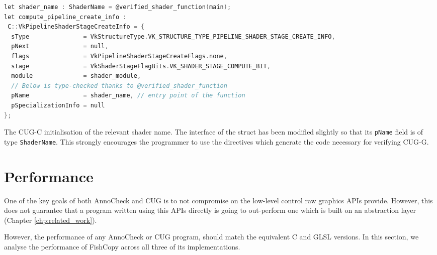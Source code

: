 \documentclass[a4paper,12pt,twoside,openright]{report}
\begin{document}
\begin{lstfloat}
\begin{lstlisting}[language=C]
let shader_name : ShaderName = @verified_shader_function(main);
let compute_pipeline_create_info :
 C::VkPipelineShaderStageCreateInfo = {
  sType               = VkStructureType.VK_STRUCTURE_TYPE_PIPELINE_SHADER_STAGE_CREATE_INFO,
  pNext               = null,
  flags               = VkPipelineShaderStageCreateFlags.none,
  stage               = VkShaderStageFlagBits.VK_SHADER_STAGE_COMPUTE_BIT,
  module              = shader_module,
  // Below is type-checked thanks to @verified_shader_function
  pName               = shader_name, // entry point of the function
  pSpecializationInfo = null
};
\end{lstlisting}
\caption{The CUG-C initialisation of the relevant shader name. The interface of
the struct has been modified slightly so that its \texttt{pName} field is of
type \texttt{ShaderName}. This strongly encourages the programmer to use the
directives which generate the code necessary for verifying CUG-G.}
\label{lst:invoke_main_cugc}
\end{lstfloat}





\section{Performance}

One of the key goals of both AnnoCheck and CUG is to not compromise on the
low-level control raw graphics APIs provide. However, this does not guarantee
that a program written using this APIs directly is going to out-perform one
which is built on an abstraction layer (Chapter \ref{chp:related_work}).

However, the performance of any AnnoCheck or CUG program, should match the
equivalent C and GLSL versions. In this section, we analyse the performance of
FishCopy across all three of its implementations.
\end{document}
